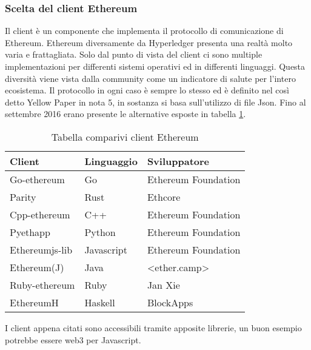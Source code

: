 \subsubsection{Scelta del client Ethereum}
Il client è un componente che implementa il protocollo di comunicazione di Ethereum. Ethereum diversamente da Hyperledger presenta una realtà molto varia e frattagliata. Solo dal punto di vista del client ci sono multiple implementazioni per differenti sistemi operativi ed in differenti linguaggi. Questa diversità viene vista dalla community come un indicatore di salute per l’intero ecosistema. Il protocollo in ogni caso è sempre lo stesso ed è definito nel così detto Yellow Paper in nota 5, in sostanza si basa sull’utilizzo di file Json. 
Fino al settembre 2016 erano presente le alternative esposte in tabella \ref{tab:comp-client}.
\begin{table}[!h] %
    \caption{Tabella comparivi client Ethereum}
    \label{tab:comp-client}
    \begin{tabularx}{\textwidth}{|X|X|X|}
    \hline
    \textbf{Client} & \textbf{Linguaggio} & \textbf{Sviluppatore}\\
    \hline
    Go-ethereum   & Go & Ethereum Foundation \\
    \hline
    Parity   & Rust & Ethcore \\
    \hline
    Cpp-ethereum   & C++ & Ethereum Foundation\\
    \hline
    Pyethapp  & Python & Ethereum Foundation\\
    \hline
    Ethereumjs-lib  & Javascript & Ethereum Foundation\\
    \hline
    Ethereum(J)  & Java & <ether.camp>\\
    \hline
    Ruby-ethereum  & Ruby & Jan Xie\\
    \hline
    EthereumH  & Haskell & BlockApps\\
    \hline
    \end{tabularx}
\end{table}%
I client appena citati sono accessibili tramite apposite librerie, un buon esempio potrebbe essere web3 per Javascript.
